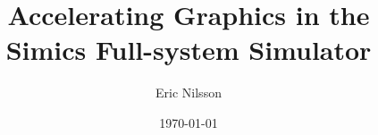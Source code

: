 \title{Accelerating Graphics in the Simics Full-system Simulator}
\author{Eric Nilsson}
\date{\today}

\begin{frame}
	\titlepage
\end{frame}
